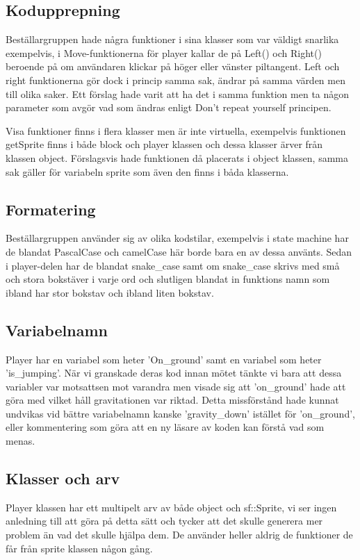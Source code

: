 \documentclass{TDP005mall}
\begin{document}
\subsection{Kodupprepning}
Beställargruppen hade några funktioner i sina klasser som var väldigt snarlika exempelvis, i Move-funktionerna för player kallar de på Left() och Right() beroende på om användaren klickar på höger eller vänster piltangent. Left och right funktionerna gör dock i princip samma sak, ändrar på samma värden men till olika saker. Ett förslag hade varit att ha det i samma funktion men ta någon parameter som avgör vad som ändras enligt Don't repeat yourself principen.

Visa funktioner finns i flera klasser men är inte virtuella, exempelvis funktionen getSprite finns i både block och player klassen och dessa klasser ärver från klassen object.
Förslagsvis hade funktionen då placerats i object klassen, samma sak gäller för variabeln sprite som även den finns i båda klasserna.

\subsection{Formatering}
Beställargruppen använder sig av olika kodstilar, exempelvis i state machine har de blandat PascalCase och camelCase här borde bara en av dessa använts. 
Sedan i player-delen har de blandat snake\_case samt om snake\_case skrivs med små och stora bokstäver i varje ord och slutligen blandat in funktions namn som ibland har stor bokstav och ibland liten bokstav.

\subsection{Variabelnamn}
Player har en variabel som heter 'On\_ground' samt en variabel som heter 'is\_jumping'. När vi granskade deras kod innan mötet tänkte vi bara att dessa variabler var motsattsen mot varandra men visade sig att 'on\_ground' hade att göra med vilket håll gravitationen var riktad. Detta missförstånd hade kunnat undvikas vid bättre variabelnamn kanske 'gravity\_down' istället för 'on\_ground', eller kommentering som göra att en ny läsare av koden kan förstå vad som menas.

\subsection{Klasser och arv}
Player klassen har ett multipelt arv av både object och sf::Sprite, vi ser ingen anledning till att göra på detta sätt och tycker att det skulle generera mer problem än vad det skulle hjälpa dem. De använder heller aldrig de funktioner de får från sprite klassen någon gång.
\end{document}
